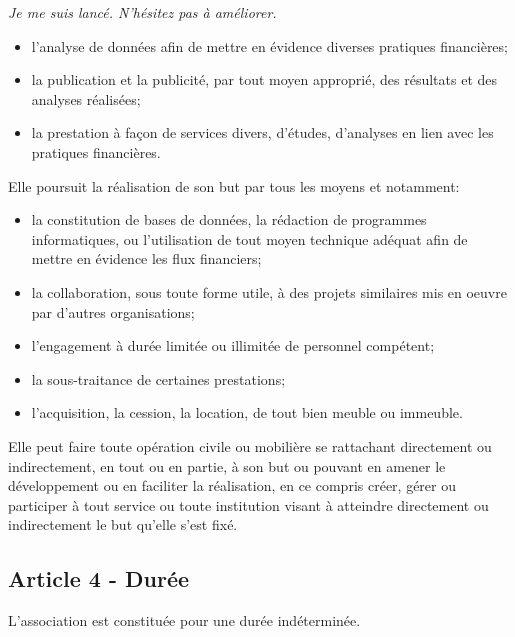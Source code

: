 \documentclass[12pt]{article}
\begin{document}
\emph{Je me suis lancé. N'hésitez pas à améliorer.}
\begin{itemize}
\item l'analyse de données afin de mettre en évidence diverses pratiques financières;

\item la publication et la publicité, par tout moyen approprié, des résultats et des analyses réalisées;
\item la prestation à façon de services divers, d'études, d'analyses en lien avec les pratiques financières.
\end{itemize}

Elle poursuit la réalisation de son but par tous les moyens et notamment:
\begin{itemize}
\item la constitution de bases de données, la rédaction de programmes informatiques, ou l'utilisation de tout moyen technique adéquat afin de mettre en évidence les flux financiers;
\item la collaboration, sous toute forme utile, à des projets similaires mis en oeuvre par d'autres organisations;
\item l'engagement à durée limitée ou illimitée de personnel compétent;
\item la sous-traitance de certaines prestations;
\item l'acquisition, la cession, la location, de tout bien meuble ou immeuble.
\end{itemize}

Elle peut faire toute opération civile ou mobilière se rattachant directement ou indirectement, en tout ou en partie, à son but ou pouvant en amener le développement ou en faciliter la réalisation, en ce compris créer, gérer ou participer à tout service ou toute institution visant à atteindre directement ou indirectement le but qu'elle s'est fixé.

\subsection*{Article 4 - Durée}
L'association est constituée pour une durée indéterminée.
\end{document}
